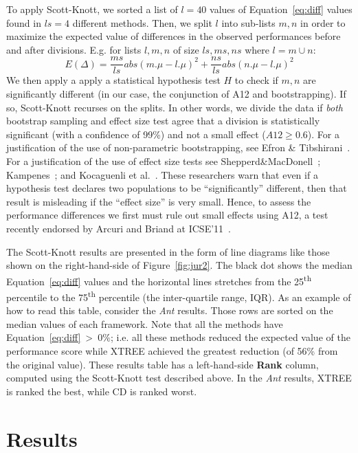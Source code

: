 \documentclass[twocolumn,5p]{elsarticle}
\newcommand{\fig}[1]{Figure~\ref{fig:#1}}
\newcommand{\eq}[1]{Equation~\ref{eq:#1}}
\theoremstyle{break}
\begin{document}
	To  apply Scott-Knott,
	we
	sorted a list of  $l=40$ values of \eq{diff} values found in  $ls=4$ 
	different methods.
	Then, we split $l$ into sub-lists $m,n$ in order to maximize the expected 
	value of differences in the observed performances before and after 
	divisions. E.g. for lists $l,m,n$ of size $ls,ms,ns$ where $l=m\cup n$: 
	\[E(\Delta)=\frac{ms}{ls}abs(m.\mu - l.\mu)^2 + \frac{ns}{ls}abs(n.\mu - 
	l.\mu)^2\]
	We then apply a apply a statistical hypothesis test $H$ to check
	if $m,n$ are significantly different  (in our case, the conjunction of A12 
	and bootstrapping). If so, Scott-Knott recurses on the splits. In other 
	words, we divide the data if \textit{both} bootstrap sampling and effect 
	size test agree that a division is statistically significant (with a 
	confidence of 99\%) and not a small effect ($A12 \ge 0.6$).
	For a justification of the use of non-parametric bootstrapping, see Efron 
	\& Tibshirani~\cite[p220-223]{efron93}. For a justification of the use of 
	effect size tests see Shepperd\&MacDonell~\cite{shepperd12a}; 
	Kampenes~\cite{kampenes07}; and Kocaguenli et 
	al.~\cite{Kocaguneli2013:ep}. 
	These researchers warn that even if a hypothesis test declares two 
	populations to be ``significantly'' different, then that result is 
	misleading if the ``effect size'' is very small. Hence, to assess the 
	performance differences we first must rule out small effects using A12, a 
	test   recently endorsed by Arcuri and Briand at ICSE'11~\cite{arcuri11}.
	
	The Scott-Knott  results are presented in the form of line diagrams like 
	those shown on the right-hand-side of \fig{jur2}.
	The black dot shows the median \eq{diff} values and the horizontal lines 
	stretches
	from the 25\textsuperscript{th} percentile to the 75\textsuperscript{th} 
	percentile (the inter-quartile range, IQR).
	As an example of how to read this table, consider the {\em Ant}
	results. Those rows are  sorted on the median values of each framework. 
	Note 
	that all the methods have \eq{diff}~\textgreater~$0\%$; i.e. all these 
	methods reduced the expected value of the performance score while XTREE 
	achieved the greatest reduction (of 56\% from the original value).
	These results table has a  left-hand-side  {\bf Rank} column, computed 
	using the
	Scott-Knott test described above. In the {\em Ant}
	results, XTREE is ranked the best, while CD is  ranked   worst.
	
	
	\section{Results}
	
\end{document}
